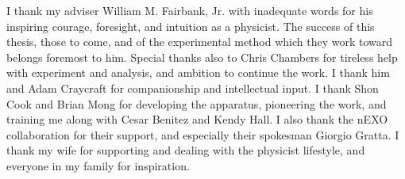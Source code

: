 \begin{acknowledgements}
I thank my adviser William M. Fairbank, Jr. with inadequate words for his inspiring courage, foresight, and intuition as a physicist.  The success of this thesis, those to come, and of the experimental method which they work toward belongs foremost to him.  Special thanks also to Chris Chambers for tireless help with experiment and analysis, and ambition to continue the work.  I thank him and Adam Craycraft for companionship and intellectual input.  I thank Shon Cook and Brian Mong for developing the apparatus, pioneering the work, and training me along with Cesar Benitez and Kendy Hall.  I also thank the nEXO collaboration for their support, and especially their spokesman Giorgio Gratta.  I thank my wife for supporting and dealing with the physicist lifestyle, and everyone in my family for inspiration.

\end{acknowledgements}